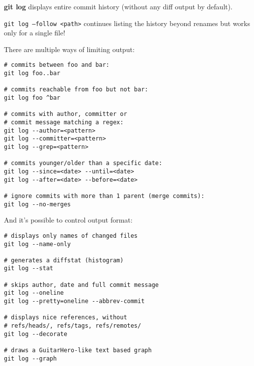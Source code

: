 %

\textbf{git log}\marginpar[\textbf{\color{blue}{log}}]{\textbf{\color{blue}{log}}} displays entire commit history (without any diff output by default).

\texttt{git log --follow <path>} continues listing the history beyond renames but works only for a single file!

There are multiple ways of limiting output:
\begin{verbatim}
# commits between foo and bar:
git log foo..bar

# commits reachable from foo but not bar:
git log foo ^bar

# commits with author, committer or
# commit message matching a regex:
git log --author=<pattern>
git log --committer=<pattern>
git log --grep=<pattern>

# commits younger/older than a specific date:
git log --since=<date> --until=<date>
git log --after=<date> --before=<date>

# ignore commits with more than 1 parent (merge commits):
git log --no-merges
\end{verbatim}

And it's possible to control output format:
\begin{verbatim}
# displays only names of changed files
git log --name-only

# generates a diffstat (histogram)
git log --stat

# skips author, date and full commit message
git log --oneline
git log --pretty=oneline --abbrev-commit

# displays nice references, without
# refs/heads/, refs/tags, refs/remotes/
git log --decorate

# draws a GuitarHero-like text based graph
git log --graph
\end{verbatim}

